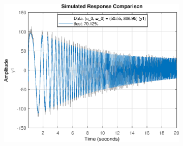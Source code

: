 \begin{figure}[H]
\begin{minipage}{0.32\textwidth}
\begin{figure}[H]
       \end{figure}
    \end{minipage}
    \begin{minipage}{0.32\textwidth}
       \begin{figure}[H]
            \includegraphics[width = \textwidth]{./figs/small_perturbation/time_Compare_1650.eps}
       \end{figure}
    \end{minipage}
\end{figure}
